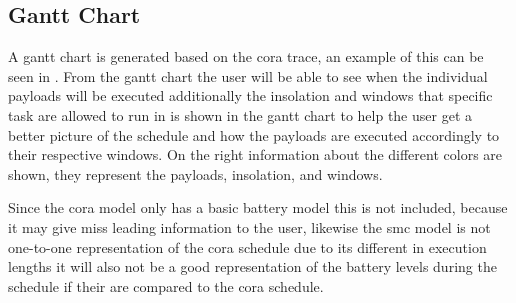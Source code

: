 \subsection{Gantt Chart}
A gantt chart is generated based on the \gls{cora} trace, an example of this can be seen in . From the gantt chart the user will be able to see when the individual payloads will be executed additionally the insolation and windows that specific task are allowed to run in is shown in the gantt chart to help the user get a better picture of the schedule and how the payloads are executed accordingly to their respective windows. On the right information about the different colors are shown, they represent the payloads, insolation, and windows. 

Since the \gls{cora} model only has a basic battery model this is not included, because it may give miss leading information to the user, likewise the \gls{smc} model is not one-to-one representation of the \gls{cora} schedule due to its different in execution lengths it will also not be a good representation of the battery levels during the schedule if their are compared to the cora schedule.